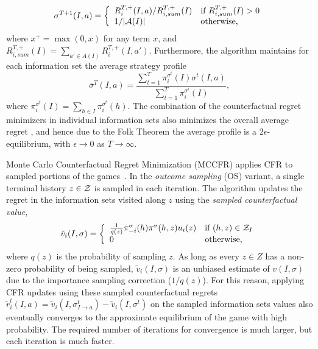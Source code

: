 \begin{equation*}
\sigma^{T+1}(I,a) = \left\{
\begin{array}{ll}
R_i^{T,+}(I,a) / R^{T,+}_{i,sum}(I) & \mbox{if } R^{T,+}_{i,sum}(I) > 0 \\
1 / |\mathcal{A}(I)|                   & \mbox{otherwise,}
\end{array} \right.
\end{equation*}
where $x^+ = \max(0,x)$ for any term $x$, and $R^{T,+}_{i,sum}(I) = \sum_{a' \in A(I)} R_i^{T,+}(I,a')$.
Furthermore, the algorithm maintains for each information set the average   strategy profile
\begin{equation}
\bar{\sigma}^T(I,a) = \frac{\sum_{t=1}^T \pi^{\sigma^t}_i(I) \sigma^t(I,a)}{\sum_{t=1}^T \pi^{\sigma^t}_i(I)},
\end{equation}
where $\pi^{\sigma^t}_i(I) = \sum_{h \in I}\pi^{\sigma^t}_i(h)$.
The combination of the counterfactual regret minimizers in individual information sets also minimizes the overall
average regret \cite{CFR}, and hence due to the Folk Theorem the average profile is a  $2\epsilon$-equilibrium,
with $\epsilon \rightarrow 0$ as $T \rightarrow \infty$.

Monte Carlo Counterfactual Regret Minimization (MCCFR) applies CFR to sampled portions of the games~\cite{Lanctot09Sampling}.
In the {\it outcome sampling} (OS) variant, a single terminal history $z\in \mathcal{Z}$ is sampled in each iteration.
The algorithm updates the regret in the information sets visited along $z$ using the
{\it sampled counterfactual value},
\begin{equation}
\tilde{v}_i(I,\sigma) = \left\{
\begin{array}{ll}
\frac{1}{q(z)} \pi^{\sigma}_{-i}(h) \pi^{\sigma}(h,z) u_i(z) & \mbox{if } (h,z) \in \mathcal{Z}_I\\
0  & \mbox{otherwise,}
\end{array} \right.
\label{eq:scv}
\end{equation}
where $q(z)$ is the probability of sampling $z$.
As long as every $z \in Z$ has a non-zero probability of being sampled, $\tilde{v}_i(I,\sigma)$ is an unbiased estimate of $v(I,\sigma)$
due to the importance sampling correction ($1/q(z)$). For this reason, applying CFR updates using these sampled counterfactual regrets
$\tilde{r}_i^t(I,a) = \tilde{v}_i(I,\sigma^t_{I \rightarrow a}) - \tilde{v}_i(I,\sigma^t)$
on the sampled information sets values also eventually converges to the approximate equilibrium of the game with high probability.
The required number of iterations for convergence is much larger, but each iteration is much faster.


